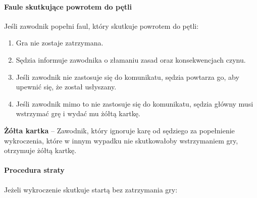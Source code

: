 \documentclass[12pt]{article}
\newcommand\yellowcard[1]{\bgroup\textcolor{darkyellow}{\textbf{#1}}}
\begin{document}
\paragraph{Faule skutkujące powrotem do pętli}
Jeśli zawodnik
popełni faul, który skutkuje powrotem do pętli:

\begin{enumerate}
	\item
	      Gra nie zostaje zatrzymana.
	\item
	      Sędzia informuje zawodnika o złamaniu zasad oraz konsekwencjach czynu.
	\item
	      Jeśli zawodnik nie zastosuje się do komunikatu, sędzia powtarza go,
	      aby upewnić się, że został usłyszany.
	\item
	      Jeśli zawodnik mimo to nie zastosuje się do komunikatu, sędzia główny
	      musi wstrzymać grę i wydać mu żółtą kartkę.
\end{enumerate}

\yellowcard{Żółta kartka} -- Zawodnik, który ignoruje karę od sędziego za
popełnienie wykroczenia, które w innym wypadku nie skutkowałoby
wstrzymaniem gry, otrzymuje żółtą kartkę.

\paragraph{Procedura straty}
Jeżeli wykroczenie skutkuje startą
bez zatrzymania gry:
\end{document}
